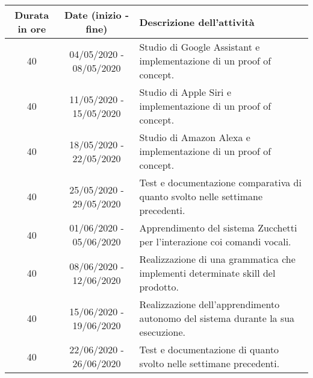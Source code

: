 

\begin{tabularx}{\textwidth}{|c|c|X|}
	\hline
	\textbf{Durata in ore} & \textbf{Date (inizio - fine)} & \textbf{Descrizione dell'attività} \\\hline
	
	40 & 04/05/2020 - 08/05/2020 & Studio di Google Assistant e implementazione di un proof of concept. \\
	\hline
    40 & 11/05/2020 - 15/05/2020 & Studio di Apple Siri e implementazione di un proof of concept. \\
    \hline
    40 & 18/05/2020 - 22/05/2020 & Studio di Amazon Alexa e implementazione di un proof of concept. \\
    \hline
    40 & 25/05/2020 - 29/05/2020 & Test e documentazione comparativa di quanto svolto nelle settimane precedenti. \\
    \hline
    40 & 01/06/2020 - 05/06/2020 & Apprendimento del sistema Zucchetti per l'interazione coi comandi vocali. \\
    \hline
    40 & 08/06/2020 - 12/06/2020 & Realizzazione di una grammatica che implementi determinate skill del prodotto. \\
    \hline
    40 & 15/06/2020 - 19/06/2020 & Realizzazione dell'apprendimento autonomo del sistema durante la sua esecuzione. \\
    \hline
    40 & 22/06/2020 - 26/06/2020 & Test e documentazione di quanto svolto nelle settimane precedenti. \\	
    \hline
\end{tabularx}